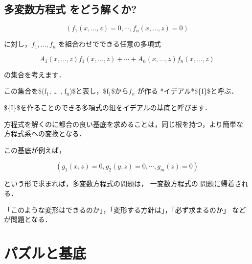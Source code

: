 \documentclass[a4j]{jarticle}
\begin{document}
\subsection{多変数方程式 をどう解くか?}
\label{sec:org89986f8}

$$(f_1(x, \ldots, z) =0, \cdots, f_n(x, \ldots, z) =0)$$

に対し，\(f_1, \ldots, f_n\) を組合わせでできる任意の多項式

$$A_1(x, \ldots, z) f_1(x, \ldots, z) + \cdots + A_n(x, \ldots, z)
f_n(x, \ldots, z)$$

の集合を考えます．

この集合を\$(f\(_{\text{1}}\), \ldots{} , f\(_{\text{n}}\))\$と表し，\$f\(_{\text{1}}\)\$から\(f_n\) が作る
*イデアル*\$\{\cal I\}\$と呼ぶ．

\$\{\cal I\}\$を作ることのできる多項式の組をイデアルの基底と呼びます．

方程式を解くのに都合の良い基底を求めることは，同じ根を持つ，より簡単な
方程式系への変換となる．

この基底が例えば，

$$(g_1(x, z) =0, g_2(y,z) = 0, \cdots, g_m(z) =0)$$

という形で求まれば，多変数方程式の問題は， 一変数方程式の
問題に帰着される．

「このような変形はできるのか」，「変形する方針は」，「必ず求まるのか」
などが問題となる．

\section{パズルと基底}
\label{sec:org071e231}
\end{document}
